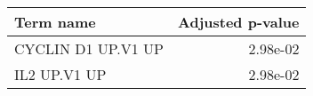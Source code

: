 \begin{tabular}{lr}
\toprule
         Term name &  Adjusted p-value \\
\midrule
CYCLIN D1 UP.V1 UP &          2.98e-02 \\
      IL2 UP.V1 UP &          2.98e-02 \\
\bottomrule
\end{tabular}
